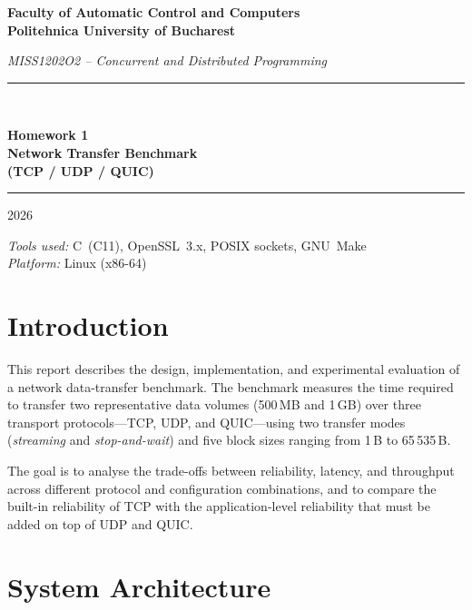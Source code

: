 \documentclass[12pt,a4paper]{article}
\begin{document}
\begin{titlepage}
  \centering
  \vspace*{2cm}
  {\LARGE\bfseries Faculty of Automatic Control and Computers\\[0.4em]
   Politehnica University of Bucharest\par}
  \vspace{1.5cm}
  {\large\itshape MISS1202O2 – Concurrent and Distributed Programming\par}
  \vspace{2cm}
  \rule{\linewidth}{1pt}\\[0.6em]
  {\Huge\bfseries Homework 1\\[0.3em]
   Network Transfer Benchmark\\[0.3em]
   (TCP / UDP / QUIC)\par}
  \rule{\linewidth}{1pt}
  \vspace{2cm}
  {\large 2026\par}
  \vfill
  {\normalsize
   \textit{Tools used:} C~(C11), OpenSSL~3.x, POSIX sockets, GNU~Make\\[0.3em]
   \textit{Platform:} Linux (x86-64)}
\end{titlepage}

\tableofcontents
\newpage

\section{Introduction}
\label{sec:intro}

This report describes the design, implementation, and experimental evaluation
of a network data-transfer benchmark. The benchmark measures the time required
to transfer two representative data volumes (500\,MB and 1\,GB) over three
transport protocols---TCP, UDP, and QUIC---using two transfer modes
(\emph{streaming} and \emph{stop-and-wait}) and five block sizes ranging from
1\,B to 65\,535\,B.

The goal is to analyse the trade-offs between reliability, latency, and
throughput across different protocol and configuration combinations, and to
compare the built-in reliability of TCP with the application-level reliability
that must be added on top of UDP and QUIC.

\section{System Architecture}
\label{sec:arch}
\end{document}
